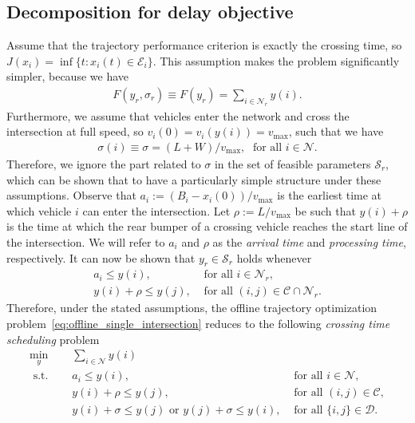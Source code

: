 \documentclass[a4paper]{article}
\theoremstyle{definition}
\theoremstyle{plain}
\begin{document}
\subsection{Decomposition for delay objective}

Assume that the trajectory performance criterion is exactly the crossing time,
so $J(x_{i}) = \inf \{ t: x_{i}(t) \in \mathcal{E}_{i} \}$. This assumption
makes the problem significantly simpler, because we have
\begin{align*}
  F(y_{r}, \sigma_{r}) \equiv F(y_{r}) = \sum_{i \in \mathcal{N}_{r}} y(i) .
\end{align*}
%
Furthermore, we assume that vehicles enter the network and cross the
intersection at full speed, so $v_{i}(0) = v_{i}(y(i)) = v_{\max}$, such that we
have
\begin{align*}
\sigma(i) \equiv \sigma = (L + W) / v_{\max}, \; \text{ for all } i \in \mathcal{N} .
\end{align*}
%
Therefore, we ignore the part related to $\sigma$ in the set of feasible
parameters $\mathcal{S}_{r}$, which can be shown that to have a particularly
simple structure under these assumptions.
Observe that $a_{i} := (B_{i} - x_{i}(0)) / v_{\max}$ is the earliest time at
which vehicle $i$ can enter the intersection.
Let $\rho := L / v_{\max}$ be such that $y(i) + \rho$ is the time at which
the rear bumper of a crossing vehicle reaches the start line of the
intersection.
We will refer to $a_{i}$ and $\rho$ as the \textit{arrival time} and \textit{processing time}, respectively.
It can now be shown that $y_{r} \in \mathcal{S}_{r}$ holds whenever
\begin{align*}
  a_{i} \leq y(i) , & \text{ for all } i \in \mathcal{N}_{r} , \\
  y(i) + \rho \leq y(j) , & \text{ for all } (i,j) \in \mathcal{C} \cap \mathcal{N}_{r} .
\end{align*}
Therefore, under the stated assumptions, the offline trajectory optimization
problem~\eqref{eq:offline_single_intersection} reduces to the following \textit{crossing time scheduling} problem
\begin{subequations}
  \label{eq:crossing_time_scheduling}
\begin{align}
  \min_{y} \quad & \sum_{i \in \mathcal{N}} y(i) \\
  \text{ s.t. } \quad & a_{i} \leq y(i) , & \text{ for all } i \in \mathcal{N} , \\
                    & y(i) + \rho \leq y(j) , & \text{ for all } (i,j) \in \mathcal{C} \label{eq:conjunctive} , \\
                    & y(i) + \sigma \leq y(j) \text{ or } y(j) + \sigma \leq y(i) , & \text{ for all } \{i,j\} \in \mathcal{D} \label{eq:disjunctive} .
\end{align}
\end{subequations}
\end{document}
